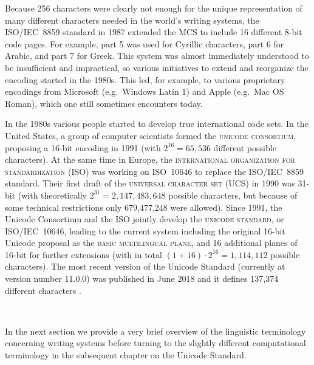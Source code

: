 Because 256 characters were clearly not enough for the unique representation of 
many different characters
needed in the world's writing systems, the ISO/IEC~8859 standard in 1987
extended the MCS to include 16 different 8-bit code pages. For example, part 5
was used for Cyrillic characters, part 6 for Arabic, and part 7 for
Greek. %
This system was almost immediately 
understood to be insufficient and impractical, so various initiatives to extend
and reorganize the encoding started in the 1980s. This led, for example, to
various proprietary encodings from Microsoft (e.g.~Windows Latin 1) and Apple
(e.g.~Mac OS Roman), which one still sometimes encounters today. 

In the 1980s various people started to develop true
international code sets. In the United States, a group of computer scientists
formed the \textsc{unicode consortium}, proposing a 16-bit encoding in 1991
(with $2^{16} = 65,536$ different possible characters). At the same time in
Europe, the \textsc{international organization for standardization} (ISO) was
working on ISO~10646 to replace the ISO/IEC~8859 standard. Their first draft of
the \textsc{universal character set} (UCS) in 1990 was 31-bit (with
theoretically $2^{31} = 2,147,483,648$ possible characters, but because of some
technical restrictions only 679,477,248 were allowed). Since 1991, the Unicode
Consortium and the ISO jointly develop the \textsc{unicode standard}, or
ISO/IEC~10646, leading to the current system including the original 16-bit
Unicode proposal as the \textsc{basic multilingual plane}, and 16 additional
planes of 16-bit for further extensions (with in total $(1+16) \cdot 2^{16} =
1,114,112$ possible characters). The most recent version of the Unicode Standard
(currently at version number 11.0.0) was published in June 2018 and it defines
137,374 different characters \citep{Unicode2018}.

\ 

\noindent In the next section we provide a very brief overview of the linguistic
terminology concerning writing systems before turning to the slightly different
computational terminology in the subsequent chapter on the Unicode Standard. 

